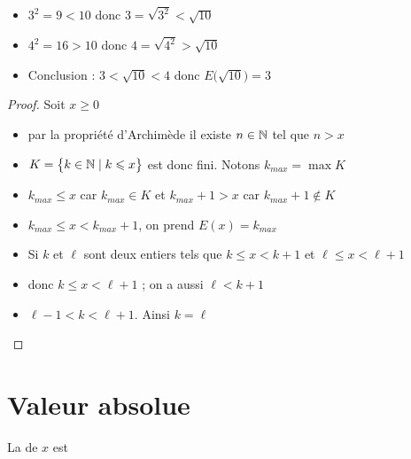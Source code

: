 \begin{frame}

\begin{exemple}
\pause
\begin{itemize}
 \item $3^2 = 9 < 10$ \pause donc $3=\sqrt{3^2} < \sqrt{10}$
\pause
 \item $4^2=16 > 10$ \pause donc $4=\sqrt{4^2} > \sqrt{10}$
\pause
 \item Conclusion : $3 < \sqrt{10} < 4$ donc $E\big(\sqrt{10}\big)=3$
\end{itemize}
\end{exemple}
\pause

\begin{proof}
 Soit $x\geq 0$
\pause
\begin{itemize}
 \item par la propriété d'Archimède  il existe $n\in \mathbb{N}$ tel que $n>x$
 \pause
 \item $K=\big\{k\in \mathbb{N} \mid k\leqslant x \big\}$ est donc fini. \pause Notons $k_{max}=\max K$
 \pause
 \item $k_{max}\leq x$ car $k_{max}\in K$ \pause et $k_{max}+1 > x$ car $k_{max}+1\notin K$
 \pause
 \item $k_{max}\leq x< k_{max}+1$, on prend $E(x)=k_{max}$
\end{itemize}

\pause

\begin{itemize}
 \item Si $k$ et $\ell$ sont deux entiers tels que $k\leq x< k+1$ et $\ell\leq x< \ell+1$
\pause  
 \item donc $k \leq x < \ell+1$ ; \pause on a aussi $\ell<k+1$
\pause 
 \item $\ell-1<k<\ell+1$. \pause Ainsi $k=\ell$
\end{itemize}
\vspace*{-3ex}
\end{proof}
	
\end{frame}

\section*{Valeur absolue}

\begin{frame}
\begin{mydefinition}
La  de $x$ est
\end{mydefinition}

\pause


	
\end{frame}

